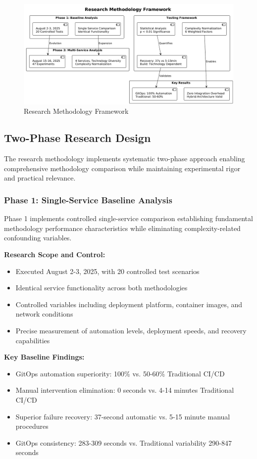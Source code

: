 \begin{figure}[h]
\centering
\includegraphics[width=1.0\textwidth]{figures/Research-Methodology-Framework.png}
\caption{Research Methodology Framework}
\label{fig:research-methodology-framework}
\end{figure}

\subsection{Two-Phase Research Design}

The research methodology implements systematic two-phase approach enabling comprehensive methodology comparison while maintaining experimental rigor and practical relevance.

\subsubsection{Phase 1: Single-Service Baseline Analysis}

Phase 1 implements controlled single-service comparison establishing fundamental methodology performance characteristics while eliminating complexity-related confounding variables.

\textbf{Research Scope and Control:}
\begin{itemize}
\item Executed August 2-3, 2025, with 20 controlled test scenarios
\item Identical service functionality across both methodologies
\item Controlled variables including deployment platform, container images, and network conditions
\item Precise measurement of automation levels, deployment speeds, and recovery capabilities
\end{itemize}

\textbf{Key Baseline Findings:}
\begin{itemize}
\item GitOps automation superiority: 100\% vs. 50-60\% Traditional CI/CD
\item Manual intervention elimination: 0 seconds vs. 4-14 minutes Traditional CI/CD
\item Superior failure recovery: 37-second automatic vs. 5-15 minute manual procedures
\item GitOps consistency: 283-309 seconds vs. Traditional variability 290-847 seconds
\end{itemize}

